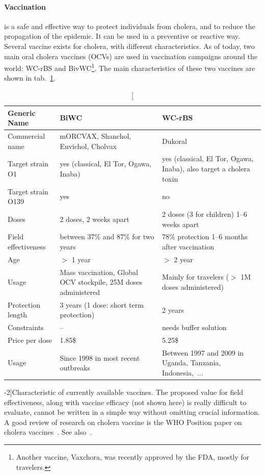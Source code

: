 \paragraph{Vaccination} is a safe and effective way to protect individuals from cholera, and to reduce the propagation of the epidemic. It can be used in a preventive or reactive way. Several vaccine exists for cholera, with different characteristics. As of today, two main oral cholera vaccines (OCVs) are used in vaccination campaigns around the world: WC-rBS and BivWC\footnote[][-2\baselineskip]{Another vaccine, Vaxchora, was recently approved by the FDA, mostly for travelers.}. The main characteristics of these two vaccines are shown in tab.~\ref{tab:vacc}.

\begin{table}[h]
\centering\small
\label{tab:prior}
\begin{tabular}{lp{40mm}p{40mm}}
\toprule
Generic Name &  BiWC & WC-rBS\\ 
\midrule
Commercial name   &  mORCVAX, Shanchol,  Euvichol, Cholvax & Dukoral  \\
Target strain O1 &   yes (classical, El Tor, Ogawa, Inaba)& yes (classical, El Tor, Ogawa, Inaba), also  target a cholera toxin  \\
Target strain O139   &  yes &      no     \\
Doses   &  2 doses, 2 weeks apart & 2 doses (3 for children) 1--6 weeks apart  \\
Field effectiveness  & between 37\% and 87\% for two years & 78\% protection 1--6 months after vaccination\\
Age   &  $>$ 1 year & $>$ 2 year      \\
Usage & Mass vaccination, Global OCV stockpile, 25M doses administered & Mainly for travelers ($>$ 1M doses administered)\\
Protection length & 3 years (1 dose: short term protection) & 2 years\\
Constraints & -- & needs buffer solution\\
Price per dose & 1.85\$ & 5.25\$ \\ 
Usage & Since 1998 in most recent outbreaks & Between 1997 and 2009 in Uganda, Tanzania, Indonesia,~... \\
\bottomrule
\end{tabular}
\caption[Characteristic of currently available vaccines][-2\baselineskip]{Characteristic of currently available vaccines. The proposed value for field effectiveness, along with vaccine efficacy (not shown here) is really difficult to evaluate, cannot be written in a simple way without omitting crucial information. A good review of research on cholera vaccine is the WHO Position paper on cholera vaccines~. See also~\textcite{WHO:BackgroundPaperWholeCell:2017,Azman:PopulationLevelEffectCholera:2016,Luquero:FirstOutbreakResponse:2013,WHO:BackgroundPaperIntegration:2009,Luquero:UseVibrioCholerae:2014,Qadri:EfficacySingledoseRegimen:2018,Bi:ProtectionCholeraKilled:2017,Azman:ImpactOneDoseTwoDose:2015,Tohme:OralCholeraVaccine:2015}.}
\label{tab:vacc}
\end{table}
